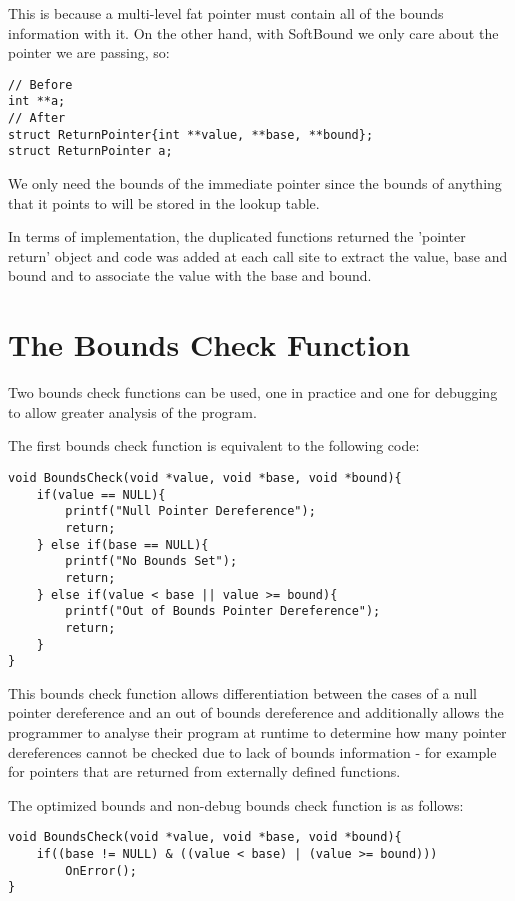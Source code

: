 This is because a multi-level fat pointer must contain all of the bounds information with it.
On the other hand, with SoftBound we only care about the pointer we are passing, so:

\begin{verbatim}
// Before
int **a;
// After
struct ReturnPointer{int **value, **base, **bound};
struct ReturnPointer a;
\end{verbatim}

We only need the bounds of the immediate pointer since the bounds of anything that it points to will be stored in the lookup table.

In terms of implementation, the duplicated functions returned the 'pointer return' object and code was added at each call site to extract the value, base and bound and to associate the value with the base and bound.

\section{The Bounds Check Function}

Two bounds check functions can be used, one in practice and one for debugging to allow greater analysis of the program.

The first bounds check function is equivalent to the following code:

\begin{verbatim}
void BoundsCheck(void *value, void *base, void *bound){
    if(value == NULL){
        printf("Null Pointer Dereference");
        return;
    } else if(base == NULL){
        printf("No Bounds Set");
        return;
    } else if(value < base || value >= bound){
        printf("Out of Bounds Pointer Dereference");
        return;
    }
}
\end{verbatim}

This bounds check function allows differentiation between the cases of a null pointer dereference and an out of bounds dereference and additionally allows the programmer to analyse their program at runtime to determine how many pointer dereferences cannot be checked due to lack of bounds information - for example for pointers that are returned from externally defined functions.

The optimized bounds and non-debug bounds check function is as follows:

\begin{verbatim}
void BoundsCheck(void *value, void *base, void *bound){
    if((base != NULL) & ((value < base) | (value >= bound)))
        OnError();
}
\end{verbatim}


